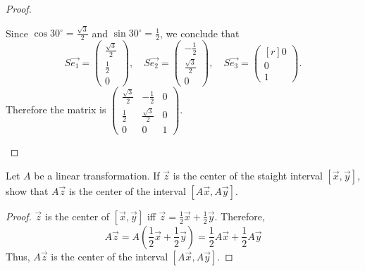 \begin{proof}
\begin{enumerate}
\begin{center}
      \end{center}
      Since $\cos30^\circ=\frac{\sqrt{3}}{2}$ and $\sin30^\circ=\frac{1}{2}$,
      we conclude that
      \[
        S\vec{e_1}= \begin{pmatrix} \frac{\sqrt{3}}{2}\\[0.2cm]\frac{1}{2}\\[0.2cm]0 \end{pmatrix},\quad
        S\vec{e_2}= \begin{pmatrix} -\frac{1}{2}\\[0.2cm]\frac{\sqrt{3}}{2}\\[0.2cm]0 \end{pmatrix},\quad
        S\vec{e_3}= \begin{pmatrix*}[r] 0\\0\\1 \end{pmatrix*}.
      \]
      Therefore the matrix is
      $ \begin{pmatrix}
        \frac{\sqrt{3}}{2} & -\frac{1}{2} & 0\\[0.2cm]
        \frac{1}{2} & \frac{\sqrt{3}}{2} & 0\\[0.2cm]
        0 & 0 &1
      \end{pmatrix}. $
  \end{enumerate}
\end{proof}
\begin{exercise}
  Let $A$ be a linear transformation. If $\vec{z}$ is the center of the
  staight interval $[\vec{x},\vec{y}]$, show that $A\vec{z}$ is the
  center of the interval $[A\vec{x}, A\vec{y}]$.
\end{exercise}
\begin{proof}
  $\vec{z}$ is the center of $[\vec{x}, \vec{y}]$ iff 
  $\vec{z}=\frac{1}{2}\vec{x}+\frac{1}{2}\vec{y}$. Therefore,
  \[
    A\vec{z}=A\left(\frac{1}{2}\vec{x}+\frac{1}{2}\vec{y}\right)
    =\frac{1}{2}A\vec{x}+\frac{1}{2}A\vec{y}
  \]
  Thus, $A\vec{z}$ is the center of the interval $[A\vec{x}, A\vec{y}]$.
\end{proof}
